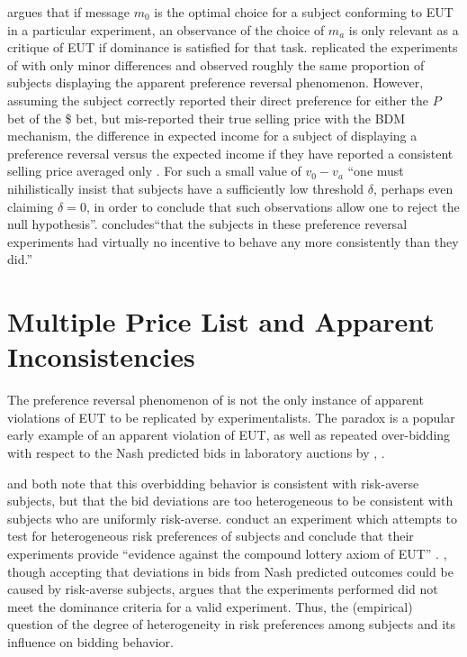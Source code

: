 \documentclass[../main.tex]{subfiles}
\begin{document}
\textcite{Harrison1989} argues that if message $m_0$ is the optimal choice for a subject conforming to EUT in a particular experiment, an observance of the choice of $m_a$ is only relevant as a critique of EUT if dominance is satisfied for that task.
\textcite{Harrison1994} replicated the experiments of\textcite{Grether1979} with only minor differences and observed roughly the same proportion of subjects displaying the apparent preference reversal phenomenon.
However, assuming the subject correctly reported their direct preference for either the $P$ bet of the {\$} bet, but mis-reported their true selling price with the BDM mechanism, the difference in expected income for a subject of displaying a preference reversal versus the expected income if they have reported a consistent selling price averaged only . 
For such a small value of $v_0 - v_a$ \enquote{one must nihilistically insist that subjects have a sufficiently low threshold $\delta$, perhaps even claiming $\delta = 0$, in order to conclude that such observations allow one to reject the null hypothesis}\parencite[1428]{Harrison1992}.
\textcite[237]{Harrison1994} concludes\enquote{that the subjects in these preference reversal experiments had virtually no incentive to behave any more consistently than they did.}

\section{\texorpdfstring{\textcite{Holt2002}}{Holt \& Laury (2002)} Multiple Price List and Apparent Inconsistencies}

The preference reversal phenomenon of \textcite{Grether1979} is not the only instance of apparent violations of EUT to be replicated by experimentalists.
The \textcite{Ellsberg1961} paradox is a popular early example of an apparent violation of EUT, as well as repeated over-bidding with respect to the Nash predicted bids in laboratory auctions by \textcite{Cox1982}, \textcite{Cox1983, Cox1983a, Cox1988}.

\textcite[160]{Cox1985} and \textcite[749]{Harrison1989} both note that this overbidding behavior is consistent with risk-averse subjects, but that the bid deviations are too heterogeneous to be consistent with subjects who are uniformly risk-averse.
\textcite{Cox1985} conduct an experiment which attempts to test for heterogeneous risk preferences of subjects and conclude that their experiments provide \enquote{evidence against the compound lottery axiom of EUT} \parencite[165]{Cox1985}.
\textcite{Harrison1989}, though accepting that deviations in bids from Nash predicted outcomes could be caused by risk-averse subjects, argues that the experiments performed did not meet the dominance criteria for a valid experiment.
Thus, the (empirical) question of the degree of heterogeneity in risk preferences among subjects and its influence on bidding behavior.
\end{document}
